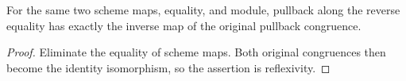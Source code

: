 \begin{lemma}
\label{lem:scheme-pullback-congruence-reverse-hom}
\leanok
For the same two scheme maps, equality, and module, pullback along the reverse
equality has exactly the inverse map of the original pullback congruence.
\end{lemma}
\begin{proof}
Eliminate the equality of scheme maps. Both original congruences then become
the identity isomorphism, so the assertion is reflexivity.
\end{proof}
